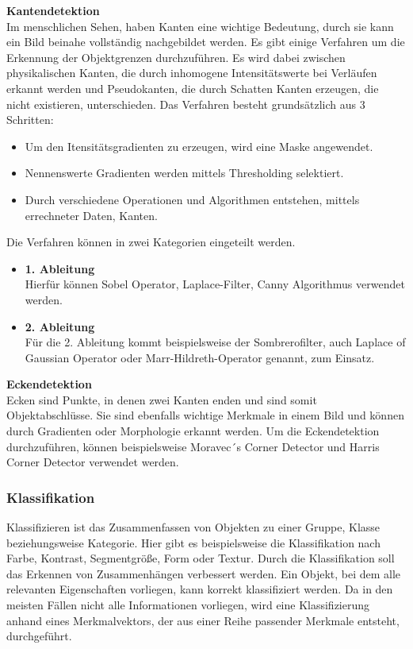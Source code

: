     \textbf{Kantendetektion}\\
    Im menschlichen Sehen, haben Kanten eine wichtige Bedeutung, durch sie kann ein Bild beinahe vollständig nachgebildet werden. Es gibt einige Verfahren um die Erkennung der Objektgrenzen durchzuführen. Es wird dabei zwischen physikalischen Kanten, die durch inhomogene Intensitätswerte bei Verläufen erkannt werden und Pseudokanten, die durch Schatten Kanten erzeugen, die nicht existieren, unterschieden.
    Das Verfahren besteht grundsätzlich aus 3 Schritten:
    \begin{itemize}
        \item Um den Itensitätsgradienten zu erzeugen, wird eine Maske angewendet.
        \item Nennenswerte Gradienten werden mittels Thresholding selektiert.
        \item Durch verschiedene Operationen und Algorithmen entstehen, mittels errechneter Daten, Kanten.
    \end{itemize}
    Die Verfahren können in zwei Kategorien eingeteilt werden.
    \begin{itemize}
        \item \textbf{1. Ableitung}\\
        Hierfür können Sobel Operator, Laplace-Filter, Canny Algorithmus verwendet werden.
        \item \textbf{2. Ableitung}\\
        Für die 2. Ableitung kommt beispielsweise der Sombrerofilter, auch Laplace of Gaussian Operator oder Marr-Hildreth-Operator genannt, zum Einsatz.
    \end{itemize}
    \textbf{Eckendetektion}\\
    Ecken sind Punkte, in denen zwei Kanten enden und sind somit Objektabschlüsse. Sie sind ebenfalls wichtige Merkmale in einem Bild und können durch Gradienten oder Morphologie erkannt werden. Um die Eckendetektion\cite{Bildverarbeitung} durchzuführen, können beispielsweise Moravec´s Corner Detector und Harris Corner Detector verwendet werden.

    \subsubsection{Klassifikation}
    Klassifizieren\cite{Bildverarbeitung} ist das Zusammenfassen von Objekten zu einer Gruppe, Klasse beziehungsweise Kategorie. Hier gibt es beispielsweise die Klassifikation nach Farbe, Kontrast, Segmentgröße, Form oder Textur. Durch die Klassifikation soll das Erkennen von Zusammenhängen verbessert werden. Ein Objekt, bei dem alle relevanten Eigenschaften vorliegen, kann korrekt klassifiziert werden. Da in den meisten Fällen nicht alle Informationen vorliegen, wird eine Klassifizierung anhand eines Merkmalvektors, der aus einer Reihe passender Merkmale entsteht, durchgeführt. 


